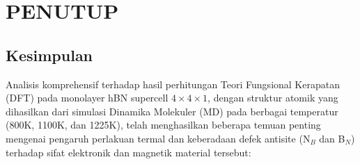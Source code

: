 \renewcommand{\thechapter}{\Roman{chapter}}
\chapter{PENUTUP}
\renewcommand{\thechapter}{\arabic{chapter}}

\section{Kesimpulan}
\label{sec:kesimpulan}
Analisis komprehensif terhadap hasil perhitungan Teori Fungsional Kerapatan (DFT) pada monolayer hBN supercell $4 \times 4 \times 1$, dengan struktur atomik yang dihasilkan dari simulasi Dinamika Molekuler (MD) pada berbagai temperatur (800K, 1100K, dan 1225K), telah menghasilkan beberapa temuan penting mengenai pengaruh perlakuan termal dan keberadaan defek antisite (N$_B$ dan B$_N$) terhadap sifat elektronik dan magnetik material tersebut:

